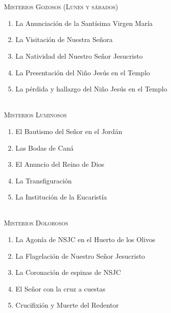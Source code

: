 \documentclass[9pt]{article}
\date{Valladolid (España), \monthyeardate\today}
\begin{document}
\begin{multicols*}{2}

    
    \vspace{1mm}
    \\[2mm]
    \\[1mm]
    \\[1mm]
    \\[1mm]
    \\
    
    \\

    \small{}\\
    \textsc{Misterios Gozosos (Lunes y sábados)}
    \begin{enumerate}
        \item La Anunciación de la Santísima Virgen María
        \item La Visitación de Nuestra Señora
        \item La Natividad del Nuestro Señor Jesucristo
        \item La Presentación del Niño Jesús en el Templo
        \item La pérdida y hallazgo del Niño Jesús en el Templo
    \end{enumerate}

    \vspace{2mm}

    \small{}\\
    \textsc{Misterios Luminosos}
    \begin{enumerate}
        \item El Bautismo del Señor en el Jordán
        \item Las Bodas de Caná
        \item El Anuncio del Reino de Dios
        \item La Transfiguración
        \item La Institución de la Eucaristía
    \end{enumerate}

    \vspace{2mm}

    \small{}\\
    \textsc{Misterios Dolorosos}
    \begin{enumerate}
        \item La Agonía de NSJC en el Huerto de los Olivos
        \item La Flagelación de Nuestro Señor Jesucristo
        \item La Coronación de espinas de NSJC
        \item El Señor con la cruz a cuestas
        \item Crucifixión y Muerte del Redentor
    \end{enumerate}


\end{multicols*}
\end{document}
